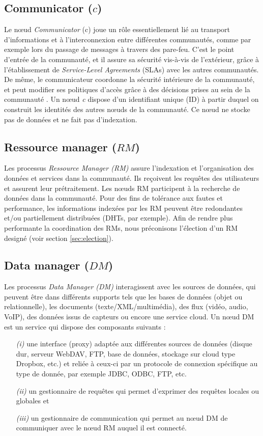 \subsection{Communicator ($c$)}
Le n{\oe}ud \textit{Communicator} (c) joue un rôle essentiellement lié au transport d'informations et à l'interconnexion entre différentes communautés, comme par exemple lors du passage de messages à travers des pare-feu. C'est le point d'entrée de la communauté, et il assure sa sécurité vis-à-vis de l'extérieur, grâce à l'établissement de \textit{Service-Level Agreements} (SLAs) avec les autres communautés. De même, le communicateur coordonne la sécurité intérieure de la communauté, et peut modifier ses politiques d'accès grâce à des décisions prises au sein de la communauté \cite{Steffenel12a}. Un n{\oe}ud \textit{c} dispose d'un identifiant unique (ID) à partir duquel on construit les identités des autres n{\oe}uds de la communauté. Ce n{\oe}ud ne stocke pas de données et ne fait pas d'indexation.

\subsection{Ressource manager ($RM$)} 
Les processus \textit{Ressource Manager (RM)} assure l'indexation et l'organisation des données et services dans la communauté. Ils reçoivent les requêtes des utilisateurs et assurent leur prétraitement. Les n{\oe}uds RM participent à la recherche de données dans la communauté. Pour des fins de tolérance aux fautes et performance, les informations indexées par les RM peuvent être redondantes et/ou partiellement distribuées (DHTs, par exemple). Afin de rendre plus performante la coordination des RMs, nous préconisons l'élection d'un RM designé (voir section \ref{sec:election}).

\subsection{Data manager ($DM$)} 
Les processus \textit{Data Manager (DM)} interagissent avec les sources de données, qui peuvent être dans différents supports tels que les bases de données (objet ou relationnelle), les documents (texte/XML/multimédia), des flux (vidéo, audio, VoIP), des données issus de capteurs ou encore une service cloud. 
Un n{\oe}ud DM est un service qui dispose des composants suivants : 
\begin{enumerate}
	\item[\textit{(i)}] une interface (proxy) adaptée aux différentes sources de données (disque dur, serveur WebDAV, FTP, base de données, stockage sur cloud type Dropbox, etc.) et reliée à ceux-ci par un protocole de connexion spécifique au type de donnée, par exemple JDBC, ODBC, FTP, etc. 
	\item[\textit{(ii)}] un gestionnaire de requêtes qui permet d'exprimer des requêtes locales ou globales et 
	\item[\textit{(iii)}] un gestionnaire de communication qui permet au n{\oe}ud DM de communiquer avec le n{\oe}ud RM auquel il est connecté. 
\end{enumerate}

